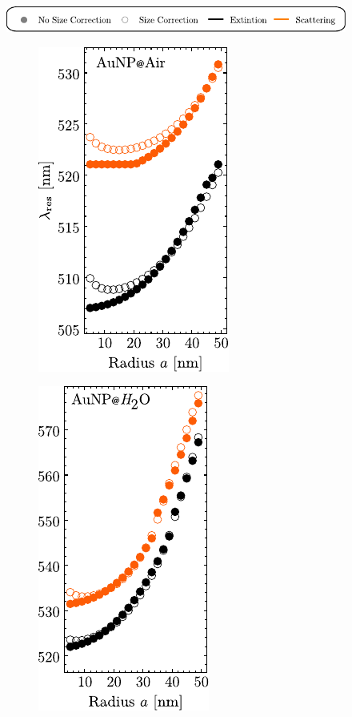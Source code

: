 \begin{figure}[h!]\centering
	\includegraphics[scale=1]{1-Theory/figs/legend.pdf}\\[.5em]
%
	\hspace*{2em}\begin{subfigure}{.05\textwidth}\caption{}\label{sfig:secondary1}\vspace*{6.35cm}\end{subfigure}
	\hspace*{-3.50em}
	\begin{subfigure}{.24\textwidth} \includegraphics[scale = 1]{1-Theory/figs/redShift_rad1.pdf}\end{subfigure}
%
	\hspace*{.25em}\begin{subfigure}{.05\textwidth}\vspace{-6.35cm}\caption{}\label{sfig:secondaty2}	\end{subfigure}
	\hspace*{-2.5em}
	\begin{subfigure}{.24\textwidth} \includegraphics[scale = 1]{1-Theory/figs/redShift_rad2.pdf}\end{subfigure}%

\end{figure}
